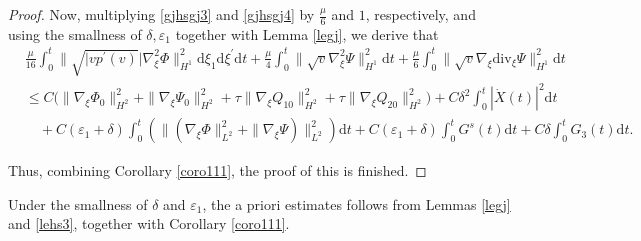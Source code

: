 \documentclass[10pt,reqno]{amsart}
\numberwithin{equation}{section}
\newcommand{\dif}{\mathrm{d}}
\newcommand{\ddiv}{\mathrm{div}}
\begin{document}
\begin{proof}
Now, multiplying \eqref{gjhsgj3} and \eqref{gjhsgj4} by $\frac{\mu}{6}$ and $1$, respectively, and using the smallness of $\delta, \varepsilon_1$ together with Lemma \ref{legj}, we derive that
\begin{equation}\label{gjhsgj6}
\begin{aligned}
&\frac{\mu}{16}\int_0^t\|\sqrt{|vp^\prime(v)}|\nabla_\xi^2\Phi\|_{H^1}^2
\dif \xi_1\dif \xi^{\prime}\dif t
+\frac{\mu}{4}\int_0^t\|\sqrt{v}\nabla^2_\xi\Psi\|_{H^1}^2\dif t
+\frac{\mu}{6}\int_0^t\|
\sqrt{v}\nabla_\xi\ddiv_\xi\Psi\|_{H^1}^2
\dif t\\
&\le C\Big(\|\nabla_\xi\Phi_0\|_{H^2}^2+\|\nabla_\xi\Psi_0\|_{H^2}^2
+\tau\|\nabla_\xi Q_{10}\|_{H^2}^2
+\tau\|\nabla_\xi Q_{20}\|_{H^2}^2\Big)+C\delta^2\int_0^t|\dot X(t)|^2\dif t\\
&\quad+C(\varepsilon_1+\delta)\int_0^t
\left(\|\left(\nabla_\xi\Phi\|_{L^2}^2+\| \nabla_\xi\Psi\right)\|_{L^2}^2
\right)
\dif t
+C(\varepsilon_1+\delta)\int_0^t
G^s(t)
\dif t
+C\delta\int_0^t
G_3(t)
\dif t.
\end{aligned}
\end{equation}

Thus, combining Corollary \ref{coro111}, the proof of this is finished.
\end{proof}

Under the smallness of $\delta$ and $\varepsilon_1$, the a priori estimates follows from Lemmas \ref{legj} and \ref{lehs3}, together with Corollary \ref{coro111}.














\end{document}
